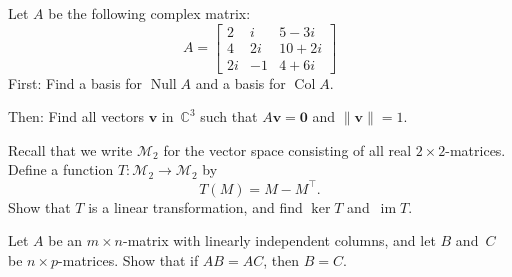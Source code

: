 \documentclass[titlepage,a4paper,12pt,english]{IMFeksamen}
\newcommand{\C}{\mathbb{C}}
\newcommand{\M}{\mathcal{M}} %
\DeclareMathOperator{\Null}{Null}
\DeclareMathOperator{\Col}{Col}
\DeclareMathOperator{\im}{im}
\newcommand{\tr}{^\top}
\newcommand{\V}[1]{\mathbf{#1}}
\renewcommand{\v}{\V{v}}
\newcommand{\0}{\V{0}}
\begin{document}
\begin{oppgave}
Let $A$ be the following complex matrix:
\[
A =
\begin{bmatrix}
2  &  i &  5 - 3i \\
4  & 2i & 10 + 2i \\
2i & -1 &  4 + 6i
\end{bmatrix}
\]
First: Find a basis for $\Null A$ and a basis for $\Col A$.

Then: Find all vectors $\v$ in~$\C^3$ such that
$A\v = \0$
and
$\| \v \| = 1$.
\end{oppgave}


\begin{oppgave}
Recall that we write $\M_2$ for the vector space consisting of all real
$2 \times 2$-matrices.
Define a function $T \colon \M_2 \to \M_2$ by
\[
T(M) = M - M\tr.
\]
Show that $T$ is a linear transformation,
and find $\ker T$ and~$\im T$.
\end{oppgave}


\begin{oppgave}
Let $A$ be an $m \times n$-matrix with linearly independent columns,
and let $B$ and~$C$ be $n \times p$-matrices.
Show that if $AB = AC$, then $B = C$.
\end{oppgave}
\end{document}

